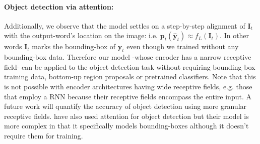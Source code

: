 \documentclass{article}
\begin{document}
\paragraph{Object detection via attention:}
Additionally, we observe that the model settles on a step-by-step alignment of $\boldsymbol{I}_t$ with the output-word's location on the image: i.e. $\boldsymbol{p}_t \left(\hat{\boldsymbol{y}}_t \right) \approx f_L\left( \boldsymbol{I}_t \right)$. In other words $\boldsymbol{I}_t$ marks the bounding-box of $\hat{\boldsymbol{y}}_t$ even though we trained without any bounding-box data. Therefore our model -whose encoder has a narrow receptive field- can be applied to the object detection task without requiring bounding box training data, bottom-up region proposals or pretrained classifiers. Note that this is not possible with encoder architectures having wide receptive fields, e.g. those that employ a RNN \cite{Deng2017ImagetoMarkupGW, Bahdanau2014NeuralMT} because their receptive fields encompass the entire input. A future work will quantify the accuracy of object detection \cite{Liu2017AttentionCI} using more granular receptive fields. \citet{DBLP:journals/corr/PedersoliLSV16} have also used attention for object detection but their model is more complex in that it specifically models bounding-boxes although it doesn't require them for training.
%
\end{document}
